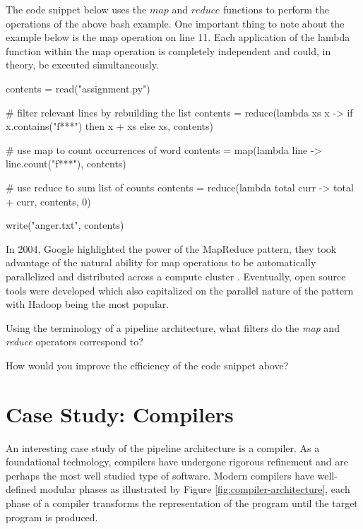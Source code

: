 The code snippet below uses the $map$ and $reduce$ functions
to perform the operations of the above bash example.
One important thing to note about the example below is the map operation on line 11.
Each application of the lambda function within the map operation is completely independent and could,
in theory, be executed simultaneously. 

\begin{code}[language=python,literate={{->}{{$\to$}}{2}{lambda}{{$\lambda$}}{1}},morekeywords={then}]{}
contents = read("assignment.py")

# filter relevant lines by rebuilding the list
contents = reduce(lambda xs x -> 
                    if x.contains("f***")
                        then x + xs
                        else xs,
                  contents)

# use map to count occurrences of word
contents = map(lambda line -> line.count("f***"), contents)

# use reduce to sum list of counts
contents = reduce(lambda total curr -> total + curr, contents, 0)

write("anger.txt", contents)
\end{code}

In 2004, Google highlighted the power of the MapReduce pattern,
they took advantage of the natural ability for map operations to be automatically parallelized and distributed across a compute cluster \cite{mapreduce}.
Eventually, open source tools were developed which also capitalized on the parallel nature of the pattern with Hadoop being the most popular.

\begin{extra}
Using the terminology of a pipeline architecture, what filters do the \textsl{map} and \textsl{reduce} operators correspond to?
\end{extra}

\begin{extra}
How would you improve the efficiency of the code snippet above?
\end{extra}

\section{Case Study: Compilers}


An interesting case study of the pipeline architecture is a compiler.
As a foundational technology, compilers have undergone rigorous refinement and are perhaps the most well studied type of software.
Modern compilers have well-defined modular phases as illustrated by Figure \ref{fig:compiler-architecture},
each phase of a compiler transforms the representation of the program until the target program is produced.

